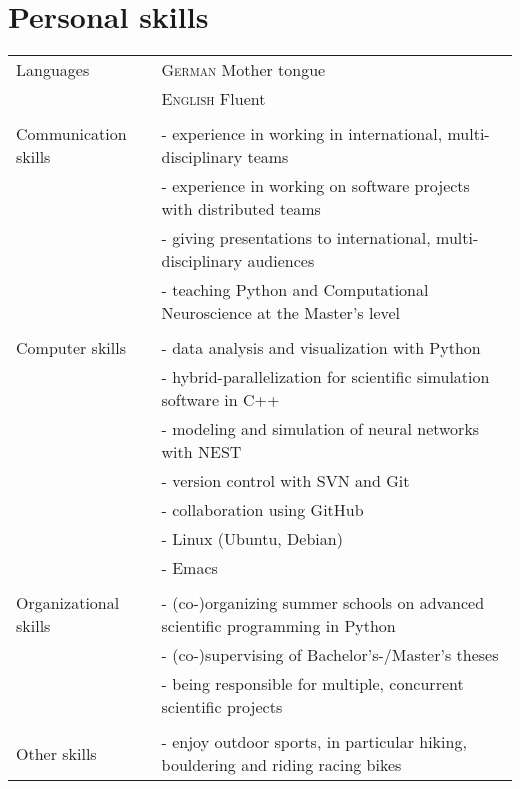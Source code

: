 \documentclass[a4paper,10pt]{article}
\begin{document}
\section{Personal skills}

\begin{tabular}{>{\hfill}p{3.3cm}|p{10.4cm}}
Languages & \textsc{German} Mother tongue \\
& \textsc{English} Fluent \\
  \multicolumn{2}{c}{} \\
Communication skills & - experience in working in international, multi-disciplinary teams \\
& - experience in working on software projects with distributed teams \\
& - giving presentations to international, multi-disciplinary audiences \\
& - teaching Python and Computational Neuroscience at the Master's level \\
  \multicolumn{2}{c}{} \\
Computer skills & - data analysis and visualization with Python \\
& - hybrid-parallelization for scientific simulation software in C++ \\
& - modeling and simulation of neural networks with NEST \\
& - version control with SVN and Git \\
& - collaboration using GitHub \\
& - Linux (Ubuntu, Debian) \\
& - Emacs \\
  \multicolumn{2}{c}{} \\
Organizational skills & - (co-)organizing summer schools on advanced scientific programming in Python \\
& - (co-)supervising of Bachelor's-/Master's theses \\
& - being responsible for multiple, concurrent scientific projects \\
  \multicolumn{2}{c}{} \\
Other skills & - enjoy outdoor sports, in particular hiking, bouldering and riding racing bikes
\end{tabular}
\end{document}
